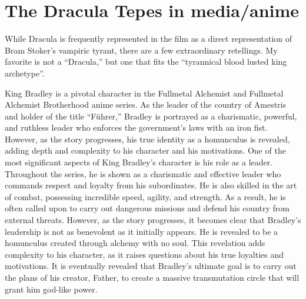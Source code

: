\documentclass[
]{article}
\begin{document}
\hypertarget{the-dracula-tepes-in-mediaanime}{%
\section{The Dracula Tepes in
media/anime}\label{the-dracula-tepes-in-mediaanime}}

While Dracula is frequently represented in the film as a direct
representation of Bram Stoker's vampiric tyrant, there are a few
extraordinary retellings. My favorite is not a ``Dracula,'' but one that
fits the ``tyrannical blood lusted king archetype''.

King Bradley is a pivotal character in the Fullmetal Alchemist and
Fullmetal Alchemist Brotherhood anime series. As the leader of the
country of Amestris and holder of the title ``Führer,'' Bradley is
portrayed as a charismatic, powerful, and ruthless leader who enforces
the government's laws with an iron fist. However, as the story
progresses, his true identity as a homunculus is revealed, adding depth
and complexity to his character and his motivations. One of the most
significant aspects of King Bradley's character is his role as a leader.
Throughout the series, he is shown as a charismatic and effective leader
who commands respect and loyalty from his subordinates. He is also
skilled in the art of combat, possessing incredible speed, agility, and
strength. As a result, he is often called upon to carry out dangerous
missions and defend his country from external threats. However, as the
story progresses, it becomes clear that Bradley's leadership is not as
benevolent as it initially appears. He is revealed to be a homunculus
created through alchemy with no soul. This revelation adds complexity to
his character, as it raises questions about his true loyalties and
motivations. It is eventually revealed that Bradley's ultimate goal is
to carry out the plans of his creator, Father, to create a massive
transmutation circle that will grant him god-like power.
\end{document}
